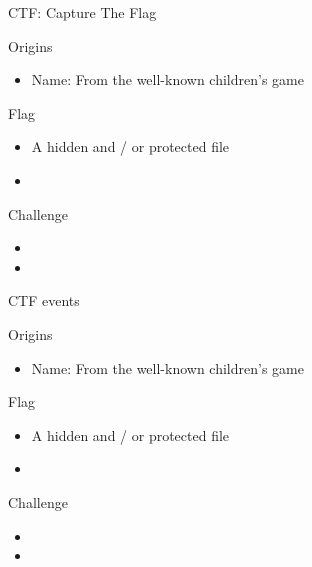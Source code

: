 \documentclass[12 pt]{beamer}
\begin{document}
\begin{frame}{CTF: Capture The Flag}

  \begin{block}{Origins}
    \begin{itemize}
      \item{Name: From the well-known children's game}
    \end{itemize}
  \end{block}

  \begin{block}{Flag}
    \begin{itemize}
        \item{A hidden and / or protected file}
        \item{}
    \end{itemize}
  \end{block}
  
  \begin{block}{Challenge}
    \begin{itemize}
        \item{}
        \item{}
    \end{itemize}
  \end{block}
  

\end{frame}


\begin{frame}{CTF events}

  \begin{block}{Origins}
    \begin{itemize}
      \item{Name: From the well-known children's game}
    \end{itemize}
  \end{block}

  \begin{block}{Flag}
    \begin{itemize}
        \item{A hidden and / or protected file}
        \item{}
    \end{itemize}
  \end{block}
  
  \begin{block}{Challenge}
    \begin{itemize}
        \item{}
        \item{}
    \end{itemize}
  \end{block}
  

\end{frame}
\end{document}

